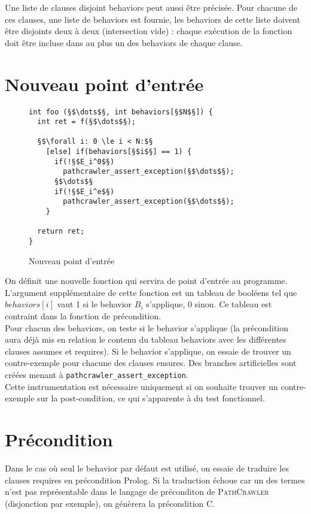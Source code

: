 Une liste de clauses disjoint behaviors peut aussi être précisée. Pour chacune
de ces clauses, une liste de behaviors est fournie, les behaviors de cette liste
doivent être disjoints deux à deux (intersection vide) : chaque exécution de la
fonction doit être incluse dans au plus un des behaviors de chaque clause.


\section{Nouveau point d'entrée}


\begin{figure}[h]
  \begin{lstlisting}
int foo (§$\dots$§, int behaviors[§$N$§]) {
  int ret = f(§$\dots$§);

  §$\forall i: 0 \le i < N:$§
    [else] if(behaviors[§$i$§] == 1) {
      if(!§$E_i^0$§)
        pathcrawler_assert_exception(§$\dots$§);
      §$\dots$§
      if(!§$E_i^e$§)
        pathcrawler_assert_exception(§$\dots$§);
    }

  return ret;
}
  \end{lstlisting}
  \caption{Nouveau point d'entrée}
\end{figure}

On définit une nouvelle fonction qui servira de point d'entrée au programme.
L'argument supplémentaire de cette fonction est un tableau de booléens tel
que $behaviors[i]$ vaut 1 si le behavior $B_i$ s'applique, 0 sinon. Ce tableau
est contraint dans la fonction de précondition.\\

Pour chacun des behaviors, on teste si le behavior s'applique (la précondition
aura déjà mis en relation le contenu du tableau behaviors avec les différentes
clauses assumes et requires). Si le behavior s'applique, on essaie de trouver un
contre-exemple pour chacune des clauses ensures. Des branches artificielles sont
créées menant à {\tt pathcrawler\_assert\_exception}.\\

Cette instrumentation est nécessaire uniquement si on souhaite trouver un
contre-exemple sur la post-condition, ce qui s'apparente à du test fonctionnel.

\section{Précondition}


Dans le cas où seul le behavior par défaut est utilisé, on essaie de traduire
les clauses requires en précondition Prolog. Si la traduction échoue car un des
termes n'est pas représentable dans le langage de préconditon de
\textsc{PathCrawler} (disjonction par exemple), on génèrera la précondition C.\\


